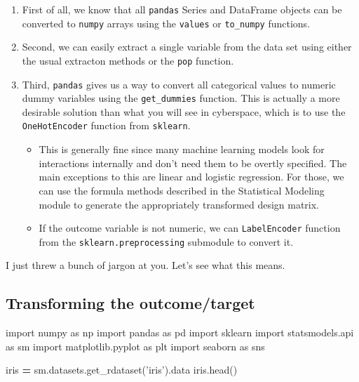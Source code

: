 \documentclass[
  letterpaper,
]{scrbook}
\newenvironment{Shaded}{\begin{snugshade}}{\end{snugshade}}
\newcommand{\ImportTok}[1]{#1}
\newcommand{\NormalTok}[1]{#1}
\newcommand{\OperatorTok}[1]{\textcolor[rgb]{0.81,0.36,0.00}{\textbf{#1}}}
\newcommand{\StringTok}[1]{\textcolor[rgb]{0.31,0.60,0.02}{#1}}
\providecommand{\tightlist}{%
  \setlength{\itemsep}{0pt}\setlength{\parskip}{0pt}}
\begin{document}
\begin{enumerate}
\def\labelenumi{\arabic{enumi}.}
\tightlist
\item
  First of all, we know that all \texttt{pandas} Series and DataFrame objects can be converted to \texttt{numpy} arrays using the \texttt{values} or \texttt{to\_numpy} functions.
\item
  Second, we can easily extract a single variable from the data set using either the usual extracton methods or the
  \texttt{pop} function.
\item
  Third, \texttt{pandas} gives us a way to convert all categorical values to numeric dummy variables using the \texttt{get\_dummies} function. This is actually a more desirable solution than what you will see in cyberspace, which is to use the
  \texttt{OneHotEncoder} function from \texttt{sklearn}.

  \begin{itemize}
  \tightlist
  \item
    This is generally fine since many machine learning models look for interactions internally and don't need them to be overtly specified. The main exceptions to this are linear and logistic regression. For those, we can use the formula methods described in the Statistical Modeling module to generate the appropriately transformed design matrix.
  \item
    If the outcome variable is not numeric, we can \texttt{LabelEncoder} function from the \texttt{sklearn.preprocessing} submodule to convert it.
  \end{itemize}
\end{enumerate}

I just threw a bunch of jargon at you. Let's see what this means.

\hypertarget{transforming-the-outcometarget}{%
\subsection{Transforming the outcome/target}\label{transforming-the-outcometarget}}

\begin{Shaded}
\begin{Highlighting}[]
\ImportTok{import}\NormalTok{ numpy }\ImportTok{as}\NormalTok{ np}
\ImportTok{import}\NormalTok{ pandas }\ImportTok{as}\NormalTok{ pd}
\ImportTok{import}\NormalTok{ sklearn}
\ImportTok{import}\NormalTok{ statsmodels.api }\ImportTok{as}\NormalTok{ sm}
\ImportTok{import}\NormalTok{ matplotlib.pyplot }\ImportTok{as}\NormalTok{ plt}
\ImportTok{import}\NormalTok{ seaborn }\ImportTok{as}\NormalTok{ sns}

\NormalTok{iris }\OperatorTok{=}\NormalTok{ sm.datasets.get_rdataset(}\StringTok{'iris'}\NormalTok{).data}
\NormalTok{iris.head()}
\end{Highlighting}
\end{Shaded}
\end{document}
